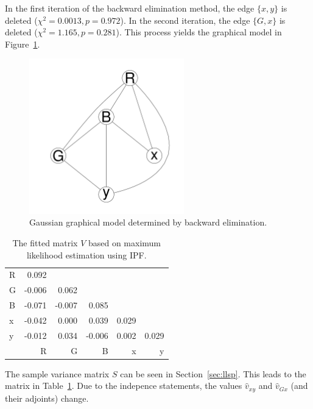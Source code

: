 \documentclass{article}
\begin{document}
In the first iteration of the backward elimination method, the edge
$\{x, y\}$ is deleted ($\chi^2=0.0013, p = 0.972$). In the second
iteration, the edge $\{G, x\}$ is deleted ($\chi^2=1.165, p =
0.281$). This process yields the graphical model in
Figure~\ref{fig:ggm}.


\begin{figure}[h]
  \centering
  \includegraphics[width=0.6\textwidth]{ggm}
  \caption{Gaussian graphical model determined by backward elimination.}
  \label{fig:ggm}
\end{figure}



\begin{table}[h] \centering 
\begin{tabular}{l|rrrrr} 
R & 0.092  &        &        &       &       \\
G & -0.006 & 0.062  &        &       &       \\
B & -0.071 & -0.007 & 0.085  &       &       \\
x & -0.042 & 0.000  & 0.039  & 0.029 &       \\
y & -0.012 & 0.034  & -0.006 & 0.002 & 0.029 \\
\midrule
  & R      & G      & B      & x     & y     \\ 
\end{tabular} 
\caption{The fitted matrix $V$ based on maximum likelihood estimation using IPF.}
\label{tab:V}
\end{table} 


The sample variance matrix $S$ can be seen in Section~\ref{sec:llsp}.
This leads to the matrix in Table~\ref{tab:V}. Due to the indepence
statements, the values $\hat{v}_{xy}$ and $\hat{v}_{Gx}$ (and their
adjoints) change.
\end{document}
